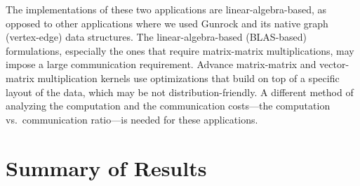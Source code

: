\documentclass[10pt,oneside]{memoir}
\begin{document}
The implementations of these two applications are linear-algebra-based,
as opposed to other applications where we used Gunrock and its native
graph (vertex-edge) data structures. The linear-algebra-based
(BLAS-based) formulations, especially the ones that require
matrix-matrix multiplications, may impose a large communication
requirement. Advance matrix-matrix and vector-matrix multiplication
kernels use optimizations that build on top of a specific layout of the
data, which may be not distribution-friendly. A different method of
analyzing the computation and the communication costs---the computation
vs.~communication ratio---is needed for these applications.

\hypertarget{summary-of-results-10}{%
\section{Summary of Results}\label{summary-of-results-10}}
\end{document}
